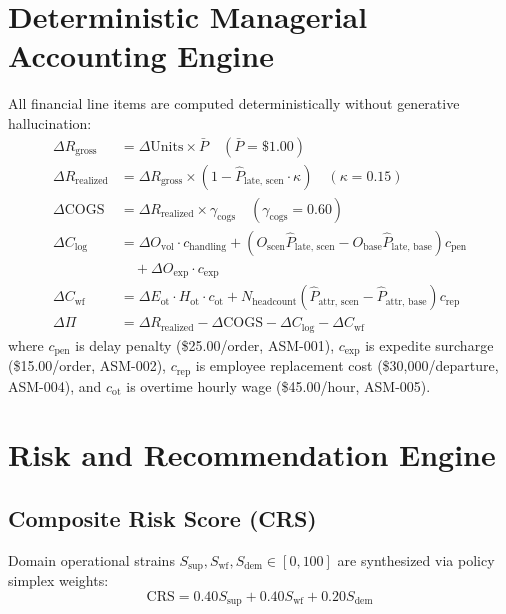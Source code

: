 \documentclass[conference]{IEEEtran}
\begin{document}
\section{Deterministic Managerial Accounting Engine}

All financial line items are computed deterministically without generative hallucination:
\begin{align}
\Delta R_{\text{gross}} &= \Delta \text{Units} \times \bar{P} \quad (\bar{P} = \$1.00) \\
\Delta R_{\text{realized}} &= \Delta R_{\text{gross}} \times (1 - \hat{P}_{\text{late, scen}} \cdot \kappa) \quad (\kappa = 0.15) \\
\Delta \text{COGS} &= \Delta R_{\text{realized}} \times \gamma_{\text{cogs}} \quad (\gamma_{\text{cogs}} = 0.60) \\
\Delta C_{\text{log}} &= \Delta O_{\text{vol}} \cdot c_{\text{handling}} + \left(O_{\text{scen}} \hat{P}_{\text{late, scen}} - O_{\text{base}} \hat{P}_{\text{late, base}}\right) c_{\text{pen}} \nonumber \\
&\quad + \Delta O_{\text{exp}} \cdot c_{\text{exp}} \\
\Delta C_{\text{wf}} &= \Delta E_{\text{ot}} \cdot H_{\text{ot}} \cdot c_{\text{ot}} + N_{\text{headcount}} \left(\hat{P}_{\text{attr, scen}} - \hat{P}_{\text{attr, base}}\right) c_{\text{rep}} \\
\Delta \Pi &= \Delta R_{\text{realized}} - \Delta \text{COGS} - \Delta C_{\text{log}} - \Delta C_{\text{wf}}
\end{align}
where $c_{\text{pen}}$ is delay penalty (\$25.00/order, ASM-001), $c_{\text{exp}}$ is expedite surcharge (\$15.00/order, ASM-002), $c_{\text{rep}}$ is employee replacement cost (\$30,000/departure, ASM-004), and $c_{\text{ot}}$ is overtime hourly wage (\$45.00/hour, ASM-005).

\section{Risk and Recommendation Engine}

\subsection{Composite Risk Score (CRS)}
Domain operational strains $S_{\text{sup}}, S_{\text{wf}}, S_{\text{dem}} \in [0, 100]$ are synthesized via policy simplex weights:
\begin{equation}
\text{CRS} = 0.40 S_{\text{sup}} + 0.40 S_{\text{wf}} + 0.20 S_{\text{dem}}
\end{equation}
\end{document}

